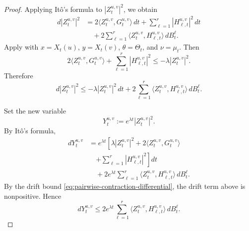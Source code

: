 \documentclass{tsp-short}
\theoremstyle{remark}
\theoremstyle{definition}
\begin{document}
\begin{proof}
	Applying It\^o's formula to \(|Z_t^{u,v}|^2\), we obtain
	\begin{align*}
		d|Z_t^{u,v}|^2 & = 2\langle Z_t^{u,v},G_t^{u,v}\rangle\,dt + \sum_{\ell=1}^r |H_{\ell,t}^{u,v}|^2\,dt \\
		               & \quad + 2\sum_{\ell=1}^r \langle Z_t^{u,v},H_{\ell,t}^{u,v}\rangle\,dB_t^\ell.
	\end{align*}
	Apply  with
	\(x=X_t(u)\), \(y=X_t(v)\), \(\theta=\Theta_t\), and \(\nu=\mu_t\). Then
	\begin{equation*}
		2\langle Z_t^{u,v},G_t^{u,v}\rangle + \sum_{\ell=1}^r |H_{\ell,t}^{u,v}|^2 \le -\lambda |Z_t^{u,v}|^2.
	\end{equation*}
	Therefore
	\begin{equation}\label{eq:pairwise-contraction-differential}
		d|Z_t^{u,v}|^2 \le -\lambda |Z_t^{u,v}|^2\,dt + 2\sum_{\ell=1}^r \langle Z_t^{u,v},H_{\ell,t}^{u,v}\rangle\,dB_t^\ell.
	\end{equation}

	Set the new variable
	\begin{equation*}
		Y_t^{u,v}:=e^{\lambda t}|Z_t^{u,v}|^2.
	\end{equation*}
	By It\^o's formula,
	\begin{align*}
		dY_t^{u,v} & = e^{\lambda t} \left[ \lambda |Z_t^{u,v}|^2 + 2\langle Z_t^{u,v},G_t^{u,v}\rangle \right.  \\
		           & \quad \left. + \sum_{\ell=1}^r |H_{\ell,t}^{u,v}|^2 \right]dt                               \\
		           & \quad+ 2e^{\lambda t} \sum_{\ell=1}^r \langle Z_t^{u,v},H_{\ell,t}^{u,v}\rangle\,dB_t^\ell.
	\end{align*}
	By the drift bound \eqref{eq:pairwise-contraction-differential}, the drift term above is nonpositive. Hence
	\begin{equation*}
		dY_t^{u,v} \le 2e^{\lambda t} \sum_{\ell=1}^r \langle Z_t^{u,v},H_{\ell,t}^{u,v}\rangle\,dB_t^\ell.
	\end{equation*}


\end{proof}
\end{document}
